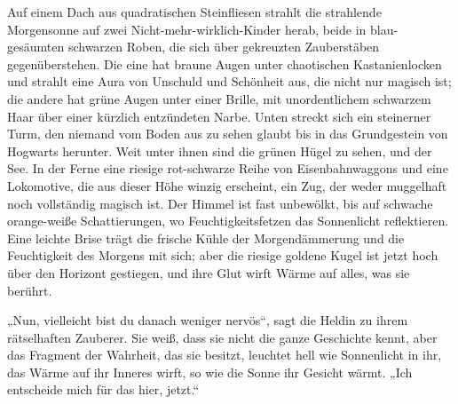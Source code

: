 \later

Auf einem Dach aus quadratischen Steinfliesen strahlt die strahlende Morgensonne auf zwei Nicht-mehr-wirklich-Kinder herab, beide in blau-gesäumten schwarzen Roben, die sich über gekreuzten Zauberstäben gegenüberstehen.
Die eine hat braune Augen unter chaotischen Kastanienlocken und strahlt eine Aura von Unschuld und Schönheit aus, die nicht nur magisch ist; die andere hat grüne Augen unter einer Brille, mit unordentlichem schwarzem Haar über einer kürzlich entzündeten Narbe. Unten streckt sich ein steinerner Turm, den niemand vom Boden aus zu sehen glaubt bis in das Grundgestein von Hogwarts herunter. Weit unter ihnen sind die grünen Hügel zu sehen, und der See. In der Ferne eine riesige rot-schwarze Reihe von Eisenbahnwaggons und eine Lokomotive, die aus dieser Höhe winzig erscheint, ein Zug, der weder muggelhaft noch vollständig magisch ist. Der Himmel ist fast unbewölkt, bis auf schwache orange-weiße Schattierungen, wo Feuchtigkeitsfetzen das Sonnenlicht reflektieren. Eine leichte Brise trägt die frische Kühle der Morgendämmerung und die Feuchtigkeit des Morgens mit sich; aber die riesige goldene Kugel ist jetzt hoch über den Horizont gestiegen, und ihre Glut wirft Wärme auf alles, was sie berührt.

„Nun, vielleicht bist du danach weniger nervös“, sagt die Heldin zu ihrem rätselhaften Zauberer. Sie weiß, dass sie nicht die ganze Geschichte kennt, aber das Fragment der Wahrheit, das sie besitzt, leuchtet hell wie Sonnenlicht in ihr, das Wärme auf ihr Inneres wirft, so wie die Sonne ihr Gesicht wärmt.
„Ich entscheide mich für das hier, jetzt.“

